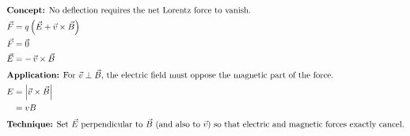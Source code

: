 \begin{idea}
    \begin{align*}
    \intertext{\textbf{Concept:} No deflection requires the net Lorentz force to vanish.}
    \vec{F} &= q\left(\vec{E}+\vec{v}\times\vec{B}\right) \\
    \vec{F} &= \vec{0} \\
    \vec{E} &= -\,\vec{v}\times\vec{B} \\
    \intertext{\textbf{Application:} For $\vec{v}\perp\vec{B}$, the electric field must oppose the magnetic part of the force.}
    E &= \left|\vec{v}\times\vec{B}\right| \\
    &= vB \\
    \intertext{\textbf{Technique:} Set $\vec{E}$ perpendicular to $\vec{B}$ (and also to $\vec{v}$) so that electric and magnetic forces exactly cancel.}
    \end{align*}
\end{idea}
